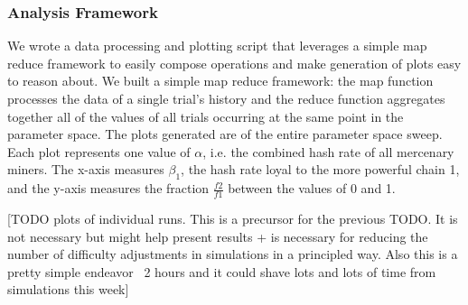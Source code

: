 \documentclass[10pt, preprint]{aastex}
\begin{document}
\subsubsection{Analysis Framework}
We wrote a data processing and plotting script that leverages a simple map reduce framework to easily compose operations and make generation of plots easy to reason about.  We built a simple map reduce framework: the map function processes the data of a single trial's history and the reduce function aggregates together all of the values of all trials occurring at the same point in the parameter space.  The plots generated are of the entire parameter space sweep.  Each plot represents one value of $\alpha$, i.e. the combined hash rate of all mercenary miners.  The x-axis measures $\beta_1$, the hash rate loyal to the more powerful chain 1, and the y-axis measures the fraction $\frac{f2}{f1}$ between the values of 0 and 1.

[TODO plots of individual runs.  This is a precursor for the previous TODO.  It is not necessary but might help present results + is necessary for reducing the number of difficulty adjustments in simulations in a principled way.  Also this is a pretty simple endeavor ~2 hours and it could shave lots and lots of time from simulations this week]
\end{document}
